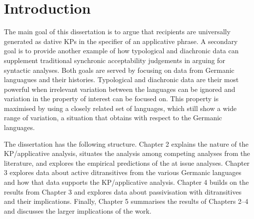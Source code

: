 \chapter{Introduction}
\label{ch:introduction}

The main goal of this dissertation is to argue that recipients are universally generated as dative KPs in the specifier of an applicative phrase. A secondary goal is to provide another example of how typological and diachronic data can supplement traditional synchronic acceptability judgements in arguing for syntactic analyses. Both goals are served by focusing on data from Germanic languagues and their histories. Typological and diachronic data are their most powerful when irrelevant variation between the languages can be ignored and variation in the property of interest can be focused on. This property is maximised by using a closely related set of languages, which still show a wide range of variation, a situation that obtains with respect to the Germanic languages.

The dissertation has the following structure. Chapter 2 explains the nature of the KP/applicative analysis, situates the analysis among competing analyses from the literature, and explores the empirical predictions of the at issue analyses. Chapter 3 explores data about active ditransitives from the various Germanic languages and how that data supports the KP/applicative analysis. Chapter 4 builds on the results from Chapter 3 and explores data about passivisation with ditransitives and their implications. Finally, Chapter 5 summarises the results of Chapters 2--4 and discusses the larger implications of the work.

%

